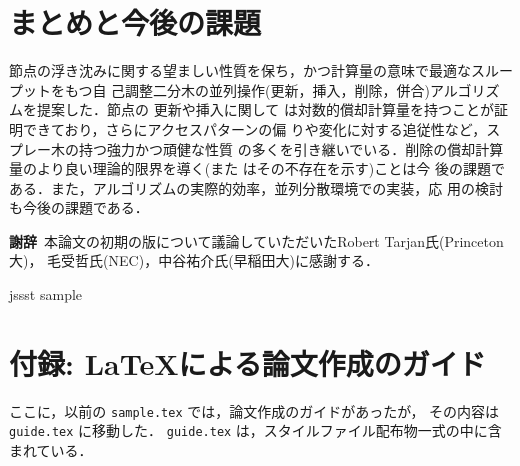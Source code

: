 \documentclass[T]{compsoft}
\begin{document}
\section{まとめと今後の課題}

節点の浮き沈みに関する望ましい性質を保ち，かつ計算量の意味で最適なスルー
プットをもつ自
己調整二分木の並列操作(更新，挿入，削除，併合)アルゴリズムを提案した．節点の
更新や挿入に関して
は対数的償却計算量を持つことが証明できており，さらにアクセスパターンの偏
りや変化に対する追従性など，スプレー木の持つ強力かつ頑健な性質
の多くを引き継いでいる．削除の償却計算量のより良い理論的限界を導く(また
はその不存在を示す)ことは今
後の課題である．また，アルゴリズムの実際的効率，並列分散環境での実装，応
用の検討も今後の課題である．


{\bf 謝辞}\
本論文の初期の版について議論していただいたRobert Tarjan氏(Princeton大)，
毛受哲氏(NEC)，中谷祐介氏(早稲田大)に感謝する．

 {jssst}
 {sample}

\appendix
\section{付録: \LaTeX による論文作成のガイド}

ここに，以前の \verb|sample.tex| では，論文作成のガイドがあったが，
その内容は \verb|guide.tex| に移動した．
\verb|guide.tex| は，スタイルファイル配布物一式の中に含まれている．
\end{document}
